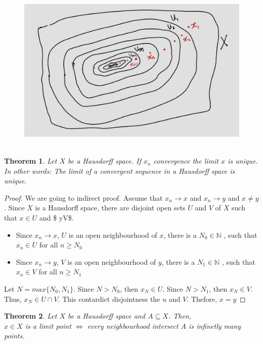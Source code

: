 \documentclass[
]{book}
\providecommand{\tightlist}{%
  \setlength{\itemsep}{0pt}\setlength{\parskip}{0pt}}
\newtheorem{theorem}{Theorem}[chapter]
\theoremstyle{definition}
\theoremstyle{definition}
\theoremstyle{definition}
\theoremstyle{definition}
\theoremstyle{remark}
\begin{document}
\begin{figure}
\centering
\includegraphics{figures/figure 18.jpg}
\caption{\label{fig:fig18}\(~\)}
\end{figure}

\begin{theorem}
\protect\hypertarget{thm:unnamed-chunk-84}{}\label{thm:unnamed-chunk-84}Let \(X\) be a Hausdorff space. If \(x_n\) convergence the limit \(x\) is unique.\\
In other words: The limit of a convergent sequence in a Hausdorff space is unique.
\end{theorem}

\begin{proof}
We are going to indirect proof. Assume that \(x_n \to x\) and \(x_n \to y\) and \(x\neq y\). Since \(X\) is a Hausdorff space, there are disjoint open sets \(U\) and \(V\) of \(X\) such that \(x\in U\) and \$ y\in V\$.

\begin{itemize}
\tightlist
\item
  Since \(x_n \to x\), \(U\) is an open neighbourhood of \(x\), there is a \(N_0\in \mathbb{N}\) , such that \(x_n \in U\) for all \(n\geq N_0\)
\item
  Since \(x_n \to y\), \(V\) is an open neighbourhood of \(y\), there is a \(N_1\in \mathbb{N}\) , such that \(x_n \in V\) for all \(n\geq N_1\)
\end{itemize}

Let \(N=max\{N_0,N_1\}\).
Since \(N>N_0\), then \(x_N\in U\).
Since \(N>N_1\), then \(x_N\in V\).
Thus, \(x_N\in U \cap V\). This contardict disjointness the \(u\) and \(V\). Thefore, \(x=y\)
\end{proof}

\begin{theorem}
\protect\hypertarget{thm:unnamed-chunk-86}{}\label{thm:unnamed-chunk-86}Let \(X\) be a Hausdorff space and \(A\subseteq X\). Then,\\
\(x\in X\) is a limit point \(\iff\) every neighbourhood intersect \(A\) is infinetly many points.
\end{theorem}
\end{document}
